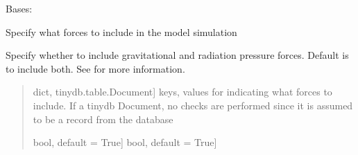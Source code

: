 \documentclass[letterpaper,10pt,english]{sphinxmanual}
\begin{document}
\begin{fulllineitems}
\label{\detokenize{nexoclom2/nexoclom2.initial_state.Forces:nexoclom2.initial_state.Forces.Forces}}
\pysigstartsignatures
\pysiglinewithargsret
{}
{\sphinxparamcomma {}}
{}
\pysigstopsignatures
\sphinxAtStartPar
Bases: {\hyperref[\detokenize{nexoclom2/nexoclom2.initial_state.InputClass:nexoclom2.initial_state.InputClass.InputClass}]{}}

\sphinxAtStartPar
Specify what forces to include in the model simulation

\sphinxAtStartPar
Specify whether to include gravitational and radiation pressure forces.
Default is to include both. See {\hyperref[\detokenize{nexoclom2/inputfiles:forces}]{}} for more information.
\begin{quote}\begin{description}
\begin{description}
\sphinxlineitem{\sphinxstylestrong{fparams}}{[}dict, tinydb.table.Document{]}
\sphinxAtStartPar
keys, values for indicating what forces to include. If a tinydb
Document, no checks are performed since it is assumed to be a record
from the database

\end{description}

\begin{description}
\sphinxlineitem{\sphinxstylestrong{gravity}}{[}bool, default = True{]}
\sphinxlineitem{\sphinxstylestrong{radpres}}{[}bool, default = True{]}
\end{description}

\end{description}\end{quote}

\begin{fulllineitems}
\label{\detokenize{nexoclom2/nexoclom2.initial_state.Forces:nexoclom2.initial_state.Forces.Forces.__firstlineno__}}
\pysigstartsignatures
\pysigline
{}
\pysigstopsignatures
\end{fulllineitems}


\end{fulllineitems}
\end{document}
